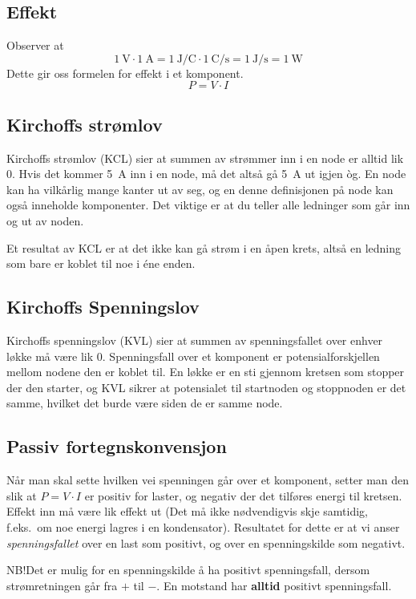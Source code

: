 \documentclass[12pt,a4paper,norsk]{article}
\begin{document}
\subsection{Effekt}
Observer at
\[\SI{1}{\volt} \cdot \SI{1}{\ampere} = \SI{1}{\joule\per\coulomb} \cdot \SI{1}{\coulomb\per\second} = \SI{1}{\joule\per\second} = \SI{1}{\watt}\]
Dette gir oss formelen for effekt i et komponent.
\[P = V \cdot I\]

\subsection{Kirchoffs strømlov}
Kirchoffs strømlov (KCL) sier at
summen av strømmer inn i en node er alltid lik 0. Hvis det kommer
\SI{5}{\ampere} inn i en node, må det altså gå \SI{5}{\ampere} ut igjen òg. En
node kan ha vilkårlig mange kanter ut av seg, og en denne definisjonen på node
kan også inneholde komponenter. Det viktige er at du teller alle ledninger som
går inn og ut av noden.

Et resultat av KCL er at det ikke kan gå strøm i en åpen krets, altså en ledning
som bare er koblet til noe i éne enden.

\subsection{Kirchoffs Spenningslov}
Kirchoffs spenningslov (KVL) sier at summen av spenningsfallet over enhver løkke må
være lik 0. Spenningsfall over et komponent er potensialforskjellen mellom
nodene den er koblet til. En løkke er en sti gjennom kretsen som stopper der den
starter, og KVL sikrer at potensialet til startnoden og stoppnoden er det
samme, hvilket det burde være siden de er samme node.

\subsection{Passiv fortegnskonvensjon}
Når man skal sette hvilken vei spenningen går over et komponent, setter man den
slik at $P = V \cdot I$ er positiv for laster, og negativ der det tilføres
energi til kretsen. Effekt inn må være lik effekt ut (Det må ikke nødvendigvis
skje samtidig, f.eks.\ om noe energi lagres i en kondensator).
Resultatet for dette er at vi anser \textit{spenningsfallet} over en last som
positivt, og over en spenningskilde som negativt.

NB!\@ Det er mulig for en spenningskilde å ha positivt spenningsfall, dersom
strømretningen går fra $+$ til $-$. En motstand har \textbf{alltid} positivt
spenningsfall.
\end{document}
